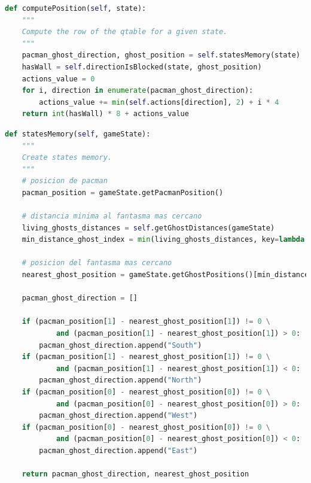 \documentclass[11pt]{exam}
\begin{document}
\begin{lstlisting}[caption={Función computePosition.}, label={computePosition}, language=python, basicstyle=\footnotesize]
def computePosition(self, state):
	"""
	Compute the row of the qtable for a given state.
	"""
	pacman_ghost_direction, ghost_position = self.statesMemory(state)
	hasWall = self.directionIsBlocked(state, ghost_position)
	actions_value = 0
	for i, direction in enumerate(pacman_ghost_direction):
		actions_value += min(self.actions[direction], 2) + i * 4
	return int(hasWall) * 8 + actions_value
\end{lstlisting}

\begin{lstlisting}[caption={Función statesMemory.}, label={statesMemory}, language=python, basicstyle=\footnotesize]
def statesMemory(self, gameState):
	"""
	Create states memory.
	"""
	# posicion de pacman
	pacman_position = gameState.getPacmanPosition()
	
	# distancia minima al fantasma mas cercano
	living_ghosts_distances = self.getGhostDistances(gameState)
	min_distance_ghost_index = min(living_ghosts_distances, key=lambda t: t[1])[0]
	
	# posicion del fantasma mas cercano
	nearest_ghost_position = gameState.getGhostPositions()[min_distance_ghost_index]
	
	pacman_ghost_direction = []
	
	if (pacman_position[1] - nearest_ghost_position[1]) != 0 \
			and (pacman_position[1] - nearest_ghost_position[1]) > 0:
		pacman_ghost_direction.append("South")
	if (pacman_position[1] - nearest_ghost_position[1]) != 0 \
			and (pacman_position[1] - nearest_ghost_position[1]) < 0:
		pacman_ghost_direction.append("North")
	if (pacman_position[0] - nearest_ghost_position[0]) != 0 \
			and (pacman_position[0] - nearest_ghost_position[0]) > 0:
		pacman_ghost_direction.append("West")
	if (pacman_position[0] - nearest_ghost_position[0]) != 0 \
			and (pacman_position[0] - nearest_ghost_position[0]) < 0:
		pacman_ghost_direction.append("East")
	
	return pacman_ghost_direction, nearest_ghost_position
\end{lstlisting}
\end{document}
